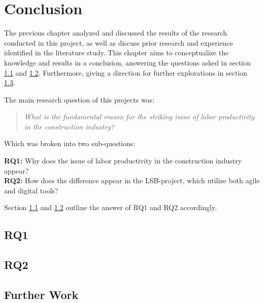 
\chapter{Conclusion} \label{cha:conclusion}
The previous chapter analyzed and discussed the results of the research conducted in this project, as well as discuss prior research and experience identified in the literature study. This chapter aims to conceptualize the knowledge and results in a conclusion, answering the questions asked in section \ref{sec:rq1} and \ref{sec:rq2}. Furthermore, giving a direction for further explorations in section \ref{sec:further_research}.

\noindent The main research question of this projects was: 
\begin{quote}
    \textit{What is the fundamental reason for the striking issue of labor productivity in the construction industry?} 
\end{quote}

\noindent Which was broken into two sub-questions:

{\noindent \bf RQ1:} Why does the issue of labor productivity in the construction industry appear? \\
{\bf RQ2:} How does the difference appear in the LSB-project, which utilize both agile and digital tools?

Section \ref{sec:rq1} and \ref{sec:rq2} outline the answer of RQ1 and RQ2 accordingly.

\section{RQ1} \label{sec:rq1}

\section{RQ2} \label{sec:rq2}

\section{Further Work} \label{sec:further_research}


\cleardoublepage